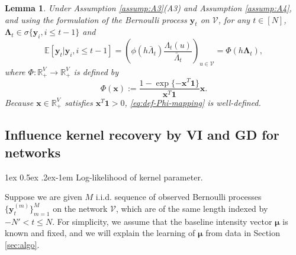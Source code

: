 \documentclass[11pt]{article}
\makeatletter
\newtheorem{lemma}[theorem]{Lemma}
\theoremstyle{remark}
\theoremstyle{plain}
\newcommand{\calV}{\mathcal{V}}
\newcommand{\E}{\mathbb{E}}
\newcommand{\R}{\mathbb{R}}
\renewcommand{\paragraph}{%
  \@startsection{paragraph}{4}%
  {\z@}{1ex \@plus 0.5ex \@minus .2ex}{-1em}%
  {\normalfont\normalsize\itshape}%
}
\makeatother
\begin{document}
\begin{lemma}\label{lemma:on-graph-bernoulli-glm}
Under Assumption \ref{assump:A3}(A3) and Assumption \ref{assump:A4}, 
and using the formulation of the Bernoulli process $\mathbf{y}_t$ on $\calV$,
for any $ t\in [N]$, $ \mathbf{\Lambda}_t  \in \sigma\{ \mathbf{y}_i, i\le  t-1 \}$ and 
\begin{equation}\label{eq:on-graph-bernoulli-glm}
\E  [ \mathbf{y}_t | \mathbf{y}_i, i \le  t-1 ]
= \left( \phi( h \bar{\Lambda}_{t} )\frac{ \Lambda_{t} (u) }{ \bar{\Lambda}_{t}} \right)_{u \in \calV}
= \Phi(  h \mathbf{\Lambda}_t  ), 
\end{equation}
where $\Phi: \R_+^V \to \R_+^V$ is defined by 
\begin{equation}\label{eq:def-Phi-mapping}
\Phi( \boldsymbol x ) := \frac{1- \exp\{ - \boldsymbol x^T \mathbf{ 1} \}}{ \boldsymbol x^T \mathbf{ 1} }  \boldsymbol x.
\end{equation}
Because $\boldsymbol x \in \R_+^V$ satisfies  $\boldsymbol x^T \mathbf{ 1} > 0$, \eqref{eq:def-Phi-mapping} is well-defined.
\end{lemma}




\subsection{Influence kernel recovery by VI and GD for networks}\label{subsec:kernel-recovery-network}

\paragraph{Log-likelihood of kernel parameter.}

Suppose we are given $M$ i.i.d. sequence of observed Bernoulli processes $\{ \mathbf{y}_t^{(m)}\}_{m=1}^M$ on the network $\calV$, which are of the same length indexed by $ -N' < t \le N$.
For simplicity, we assume that the baseline intensity vector $\boldsymbol \mu$ is known and fixed, 
and we will explain the learning of $\boldsymbol \mu$ from data in Section \ref{sec:algo}. 
\end{document}
